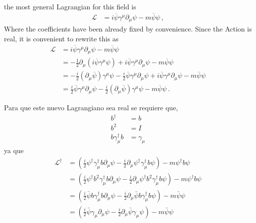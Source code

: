 the most general Lagrangian for this field is
\begin{align}
   \mathcal{L}&=i \overline{\psi} \gamma^\mu\partial_\mu\psi-m\overline{\psi} \psi\,,
\end{align}
Where the coefficients have been already fixed by convenience. Since the Action is real, it is convenient to rewrite this as
\begin{align}
   \mathcal{L}&=i \overline{\psi} \gamma^\mu\partial_\mu\psi-m\overline{\psi} \psi\nonumber\\
&=-\frac{1}{2}\partial_\mu\left(i \overline{\psi} \gamma^\mu\psi\right)+i \overline{\psi} \gamma^\mu\partial_\mu\psi-m\overline{\psi} \psi\nonumber\\
  &=-\frac{i}{2}(\partial_\mu \overline{\psi}) \gamma^\mu\psi-\frac{i}{2} \overline{\psi} \gamma^\mu\partial_\mu\psi+i \overline{\psi} \gamma^\mu\partial_\mu\psi-m\overline{\psi} \psi\nonumber\\
  &=\frac{i}{2} \overline{\psi} \gamma^\mu\partial_\mu\psi-\frac{i}{2}(\partial_\mu \overline{\psi}) \gamma^\mu\psi-m\overline{\psi} \psi\,.
\end{align}
 
Para que este nuevo Lagrangiano sea real se requiere que,
\begin{align}
  \label{eq:185qft}
  b^\dagger&=b\nonumber\\
  b^2&=I\nonumber\\
  b \gamma_\mu^\dagger b&=\gamma_\mu
\end{align}
ya que
\begin{align*}
  \mathcal{L}^\dagger&=\left(\frac{i}{2}\psi^\dagger \gamma_\mu^\dagger b \partial_\mu\psi-\frac{i}{2}\partial_\mu\psi^\dagger \gamma_\mu^\dagger b\psi\right)-m\psi^\dagger  b \psi\\
  &=\left(\frac{i}{2}\psi^\dagger b^2 \gamma_\mu^\dagger b \partial_\mu\psi-\frac{i}{2}\partial_\mu\psi^\dagger b^2 \gamma_\mu^\dagger b\psi\right)-m\psi^\dagger b \psi\\
  &=\left(\frac{i}{2}\bar{\psi} b \gamma_\mu^\dagger b \partial_\mu\psi-\frac{i}{2}\partial_\mu\bar{\psi}b \gamma_\mu^\dagger b\psi\right)-m\bar{\psi} \psi\\
  &=\left(\frac{i}{2}\bar{\psi} \gamma_\mu \partial_\mu\psi-\frac{i}{2}\partial_\mu\bar{\psi}\gamma_\mu \psi\right)-m\bar{\psi} \psi
\end{align*}


